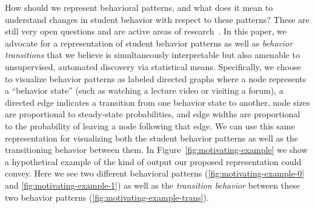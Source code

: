 How should we represent behavioral patterns, and what does it mean to
understand changes in student behavior with respect to these patterns?
These are still very open questions and are active areas of
research~\cite{Kizilcec:2013:LAK, Faucon:2016:EDM, Davis:2016:EDM,
Shih:2010:EDM}. In this paper, we advocate for a representation of student
behavior patterns as well as \emph{behavior transitions} that we believe is
simultaneously interpretable but also amenable to unsupervised, automated
discovery via statistical means. Specifically, we choose to visualize
behavior patterns as labeled directed graphs where a node represents a
``behavior state'' (such as watching a lecture video or visiting a forum),
a directed edge indicates a transition from one behavior state to another,
node sizes are proportional to steady-state probabilities, and edge widths
are proportional to the probability of leaving a node following that edge.
We can use this same representation for visualizing both the student
behavior patterns as well as the transitioning behavior between them. In
Figure~\ref{fig:motivating-example} we show a hypothetical example of the
kind of output our proposed representation could convey.  Here we see two
different behavioral patterns (\ref{fig:motivating-example-0} and
\ref{fig:motivating-example-1}) as well as the \emph{transition behavior}
between these two behavior patterns (\ref{fig:motivating-example-trans}).
